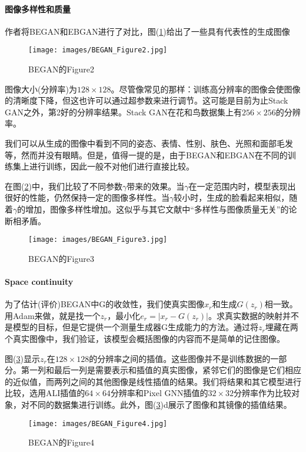             \paragraph{图像多样性和质量}作者将BEGAN和EBGAN进行了对比，图(\ref{fig:BEGAN的Figure2})给出了一些具有代表性的生成图像
                \begin{figure}[H]
                \centering
                \texttt{[image: images/BEGAN\_Figure2.jpg]}
                \caption{BEGAN的Figure2}
                \label{fig:BEGAN的Figure2}
                \end{figure}
            图像大小(分辨率)为$128\times 128$。尽管像常见的那样：训练高分辨率的图像会使图像的清晰度下降，但这也许可以通过超参数来进行调节。这可能是目前为止Stack GAN之外，第2好的分辨率结果。Stack GAN在花和鸟数据集上有$256\times 256$的分辨率。
            \par
            我们可以从生成的图像中看到不同的姿态、表情、性别、肤色、光照和面部毛发等，然而并没有眼睛。但是，值得一提的是，由于BEGAN和EBGAN在不同的训练集上进行训练，因此一般不对他们进行直接比较。
            \par
            在图(\ref{fig:BEGAN的Figure3})中，我们比较了不同参数$\gamma$带来的效果。当$\gamma$在一定范围内时，模型表现出很好的性能，仍然保持一定的图像多样性。当$\gamma$较小时，生成的脸看起来相似，随着$\gamma$的增加，图像多样性增加。这似乎与其它文献中“多样性与图像质量无关”的论断相矛盾。
                \begin{figure}[H]
                \centering
                \texttt{[image: images/BEGAN\_Figure3.jpg]}
                \caption{BEGAN的Figure3}
                \label{fig:BEGAN的Figure3}
                \end{figure}
            \paragraph{Space continuity} 为了估计(评价)BEGAN中G的收敛性，我们使真实图像$x_r$和生成$G(z_r)$相一致。用Adam来做，就是找一个$z_r$，最小化$e_r = |x_r - G(z_r)|$。求真实数据的映射并不是模型的目标，但是它提供一个测量生成器G生成能力的方法。通过将$z_r$埋藏在两个真实图像中，我们验证，该模型会概括图像的内容而不是简单的记住图像。
            \par
            图(\ref{fig:BEGAN的Figure4})显示$z_r$在$128\times 128$的分辨率之间的插值。这些图像并不是训练数据的一部分。第一列和最后一列是需要表示和插值的真实图像，紧邻它们的图像是它们相应的近似值，而两列之间的其他图像是线性插值的结果。我们将结果和其它模型进行比较，选用ALI插值的$64\times 64$分辨率和Pixel GNN插值的$32\times 32$分辨率作为比较对象，对不同的数据集进行训练。此外，图(\ref{fig:BEGAN的Figure4})d展示了图像和其镜像的插值结果。
                \begin{figure}[H]
                \centering
                \texttt{[image: images/BEGAN\_Figure4.jpg]}
                \caption{BEGAN的Figure4}
                \label{fig:BEGAN的Figure4}
                \end{figure}
